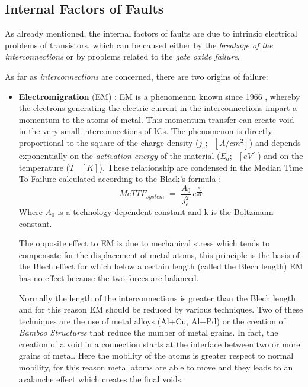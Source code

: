 {{		\subsection{Internal Factors of Faults}{
			As already mentioned, the internal factors of faults are due to intrinsic electrical problems of transistors, which can be caused either by the \textit{breakage of the interconnections} or by problems related to the \textit{gate oxide failure}.
			
			As far as \textit{interconnections} are concerned, there are two origins of failure:
			\begin{itemize}
				\item \textbf{Electromigration} (EM) : EM is a phenomenon known since 1966 , whereby the electrons generating the electric current in the interconnections impart a momentum to the atoms of metal. This momentum transfer can create void in the very small interconnections of ICs. The phenomenon is directly proportional to the square of the charge density ($j_e;\;\; [A/cm^2]$) and depends exponentially on the \textit{activation energy} of the material ($E_a;\;\;[eV]$) and on the temperature ($T \;\;\;[K]$). These relationship are condensed in the Median Time To Failure calculated according to the Black's formula :	
				\begin{equation}
					MeTTF_{system} \;=\; \frac{A_0}{j_e^2}\,e^{\frac{E_a}{kT}} 
				\end{equation}
				Where $A_0$ is a technology dependent constant and k is the Boltzmann constant. 
				
				The opposite effect to EM is due to mechanical stress which tends to compensate for the displacement of metal atoms, this principle is the basis of the Blech effect for which below a certain length (called the Blech length) EM has no effect because the two forces are balanced.
				
				Normally the length of the interconnections is greater than the Blech length and for this reason EM should be reduced by various techniques. Two of these techniques are the use of metal alloys (Al+Cu, Al+Pd) or the creation of \textit{Bamboo Structures} that reduce the number of metal grains. In fact, the creation of a void in a connection starts at the interface between two or more grains of metal. Here the mobility of the atoms is greater respect to normal mobility, for this reason metal atoms are able to move  and they leads to an avalanche effect which creates the final voids.	\\
				

\end{itemize}}}}
